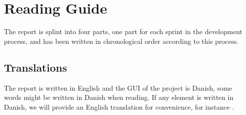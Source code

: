 
\section*{Reading Guide}
The report is splint into four parts, one part for each sprint in the development process\parencite{scrum}, and has been written in chronological order according to this process. 

\subsection*{Translations}
\label{sub:translations}
The report is written in English and the GUI of the project is Danish, some words might be written in Danish when reading. If any element is written in Danish, we will provide an English translation for convenience, for instance .

